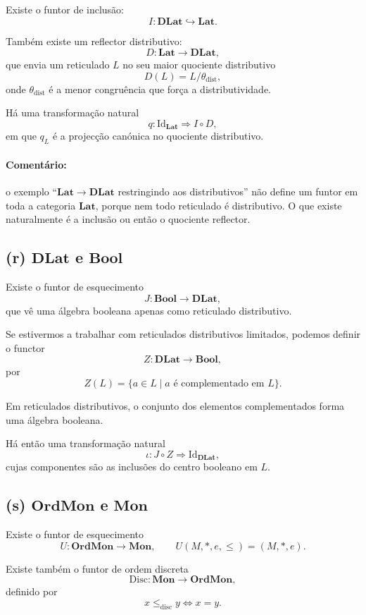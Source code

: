 \documentclass[a4paper,12pt]{article}
\begin{document}
Existe o funtor de inclusão:
\[
I:\mathbf{DLat}\hookrightarrow \mathbf{Lat}.
\]

Também existe um reflector distributivo:
\[
D:\mathbf{Lat}\to \mathbf{DLat},
\]
que envia um reticulado $L$ no seu maior quociente distributivo
\[
D(L)=L/\theta_{\mathrm{dist}},
\]
onde $\theta_{\mathrm{dist}}$ é a menor congruência que força a distributividade.

Há uma transformação natural
\[
q:\mathrm{Id}_{\mathbf{Lat}} \Rightarrow I\circ D,
\]
em que $q_L$ é a projecção canónica no quociente distributivo.

\paragraph{Comentário:}
o exemplo ``$\mathbf{Lat}\to \mathbf{DLat}$ restringindo aos distributivos''
não define um funtor em toda a categoria $\mathbf{Lat}$, porque nem todo
reticulado é distributivo. O que existe naturalmente é a inclusão ou então o
quociente reflector.

\subsection*{(r) \(\mathbf{DLat}\) e \(\mathbf{Bool}\)}

Existe o funtor de esquecimento
\[
J:\mathbf{Bool}\to \mathbf{DLat},
\]
que vê uma álgebra booleana apenas como reticulado distributivo.

Se estivermos a trabalhar com reticulados distributivos limitados, podemos
definir o functor
\[
Z:\mathbf{DLat}\to \mathbf{Bool},
\]
por
\[
Z(L)=\{a\in L \mid a \text{ é complementado em }L\}.
\]

Em reticulados distributivos, o conjunto dos elementos complementados forma uma
álgebra booleana.

Há então uma transformação natural
\[
\iota: J\circ Z \Rightarrow \mathrm{Id}_{\mathbf{DLat}},
\]
cujas componentes são as inclusões do centro booleano em $L$.

\subsection*{(s) \(\mathbf{OrdMon}\) e \(\mathbf{Mon}\)}

Existe o funtor de esquecimento
\[
U:\mathbf{OrdMon}\to \mathbf{Mon},
\qquad
U(M,\ast,e,\le)=(M,\ast,e).
\]

Existe também o funtor de ordem discreta
\[
\mathrm{Disc}:\mathbf{Mon}\to \mathbf{OrdMon},
\]
definido por
\[
x\le_{\mathrm{disc}} y \iff x=y.
\]
\end{document}
